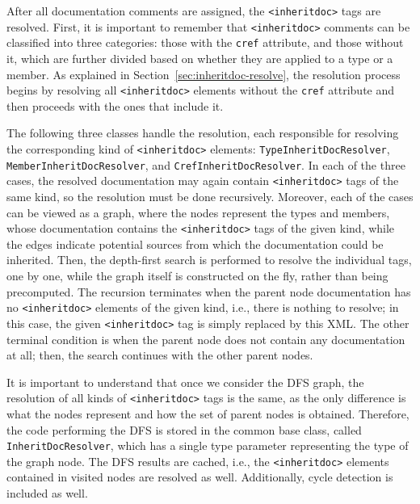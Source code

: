 After all documentation comments are assigned, the \texttt{<inheritdoc>} tags are resolved.
First, it is important to remember that \texttt{<inheritdoc>} comments can be classified into three categories: those with the \texttt{cref} attribute, and those without it, which are further divided based on whether they are applied to a type or a member.
As explained in Section~\ref{sec:inheritdoc-resolve}, the resolution process begins by resolving all \texttt{<inheritdoc>} elements without the \texttt{cref} attribute and then proceeds with the ones that include it.

The following three classes handle the resolution, each responsible for resolving the corresponding kind of \texttt{<inheritdoc>} elements: \texttt{TypeInheritDoc\-Resolver}, \texttt{MemberInheritDocResolver}, and \texttt{CrefInheritDocResolver}.
In each of the three cases, the resolved documentation may again contain \texttt{<inheritdoc>} tags of the same kind, so the resolution must be done recursively.
Moreover, each of the cases can be viewed as a graph, where the nodes represent the types and members, whose documentation contains the \texttt{<inheritdoc>} tags of the given kind, while the edges indicate potential sources from which the documentation could be inherited.
Then, the depth-first search is performed to resolve the individual tags, one by one, while the graph itself is constructed on the fly, rather than being precomputed.
The recursion terminates when the parent node documentation has no \texttt{<inheritdoc>} elements of the given kind, i.e., there is nothing to resolve; in this case, the given \texttt{<inheritdoc>} tag is simply replaced by this XML.
The other terminal condition is when the parent node does not contain any documentation at all; then, the search continues with the other parent nodes.

It is important to understand that once we consider the DFS graph, the resolution of all kinds of \texttt{<inheritdoc>} tags is the same, as the only difference is what the nodes represent and how the set of parent nodes is obtained.
Therefore, the code performing the DFS is stored in the common base class, called \texttt{InheritDocResolver}, which has a single type parameter representing the type of the graph node.
The DFS results are cached, i.e., the \texttt{<inheritdoc>} elements contained in visited nodes are resolved as well.
Additionally, cycle detection is included as well.

